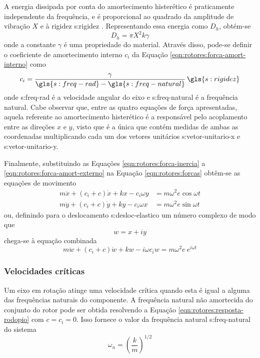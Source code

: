 \documentclass[12pt,oneside,english,brazil,lmodern,siglas,simbolos,cite=num]{ucsmonograph}
\begin{document}
	A energia dissipada por conta do amortecimento histerético é praticamente independente da frequência, e é proporcional ao quadrado da amplitude de vibração $ X $ e à rigidez \gls{s:rigidez} \cite{dimarogonas:1995}.
	Representando essa energia como $ D_h $, obtém-se
	\begin{equation}
		D_h = \pi X^2k\gamma
	\end{equation}
	onde a constante $ \gamma $ é uma propriedade do material.
	Através disso, pode-se definir o coeficiente de amortecimento interno $ c_i $ da Equação \ref{eqn:rotores:forca-amort-interno} como \cite{dimarogonas:1995}
	\begin{equation}
		c_i = \frac{\gamma}{\gls{s:freq-rad} - \gls{s:freq-natural}}\,\gls{s:rigidez}
	\end{equation}
	onde \gls{s:freq-rad} é a velocidade angular do eixo e \gls{s:freq-natural} é a frequência natural.
	Cabe observar que, entre as quatro equações de força apresentadas, aquela referente ao amortecimento histerético é a responsável pelo acoplamento entre as direções $ x $ e $ y $, visto que é a única que contém medidas de ambas as coordenadas multiplicando cada um dos vetores unitários \gls{s:vetor-unitario-x} e \gls{s:vetor-unitario-y}.
	
	Finalmente, substituindo as Equações \ref{eqn:rotores:forca-inercia} a \ref{eqn:rotores:forca-amort-externo} na Equação \ref{eqn:rotores:forcas} obtêm-se as equações de movimento \cite{rao:2008}
	\begin{align}
		m\ddot{x} + (c_i + c)\dot{x} + kx - c_i\omega y &= m\omega^2\mathit{e}\cos\omega t \\
		m\ddot{y} + (c_i + c)\dot{y} + ky - c_i\omega x &= m\omega^2\mathit{e}\sin\omega t
	\end{align}
	ou, definindo para o deslocamento \gls{s:desloc-elastico} um número complexo de modo que \[ w = x + iy \] chega-se à equação combinada
	\begin{equation}\label{eqn:rotores:resposta-rodopio}
		m\ddot{w} + (c_i + c)\dot{w} + kw - i\omega c_i w = m\omega^2 \mathit{e}\ e^{i\omega t}
	\end{equation}
	
	\subsubsection{Velocidades críticas}
	Um eixo em rotação atinge uma velocidade crítica quando esta é igual a alguma das frequências naturais do componente.
	A frequência natural não amortecida do conjunto do rotor pode ser obtida \cite{rao:2008} resolvendo a Equação \ref{eqn:rotores:resposta-rodopio} com $ c = c_i = 0 $.
	Isso fornece o valor da frequência natural \gls{s:freq-natural} do sistema
	\begin{equation} \label{eqn:freq-natural}
		\omega_n = \left( \frac{k}{m} \right)^{1/2}
	\end{equation}
	
\end{document}
